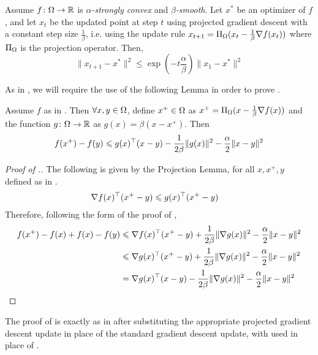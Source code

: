 \begin{theorem} 
Assume $f\colon\Omega\to\mathbb{R}$ is \emph{$\alpha$-strongly convex} and
\emph{$\beta$-smooth}. Let $x^{*}$ be an optimizer of $f$, and let $x_{t}$ be
the updated point at step $t$ using projected gradient descent with a constant
step size $\frac{1}{\beta}$, i.e. using the update rule $x_{t+1} =
\Pi_{\Omega}(x_{t} - \frac{1}{\beta}\nabla f(x_{t}))$ where $\Pi_{\Omega}$ is
the projection operator. Then, 
\[
\|x_{t+1} - x^*\|^2 \leq \exp{(-t \frac{\alpha}{\beta})}\|x_1 - x^*\|^2
\]
\end{theorem}
As in , we will require the
use of the following Lemma in order to prove
. 

\begin{lemma}
    Assume $f$ as in . Then $\forall x,y \in \Omega$, define $x^+\in\Omega$ as $x^+ = \Pi_{\Omega}(x - \frac{1}{\beta}\nabla f(x))$ and the function $g\colon\Omega\to\mathbb{R}$ as $g(x) = \beta(x-x^+)$. Then
    \[
        f(x^+) - f(y) \leqslant g(x)^\top (x-y) - \frac{1}{2\beta}\|g(x)\|^2 - \frac{\alpha}{2}\|x-y\|^2
    \]
\end{lemma}

\begin{proof}[Proof of .]
    The following is given by the Projection Lemma, for all $x,x^+,y$ defined as in .
    \begin{align*}
        \nabla f(x)^\top (x^+ - y) &\leqslant g(x)^\top(x^+ - y)
    \end{align*}
    Therefore, following the form of the proof of ,
    \begin{align*}
        f(x^+) - f(x) + f(x) - f(y) &\leqslant \nabla f(x)^\top(x^+-y) + \frac{1}{2\beta}\|\nabla g(x)\|^2 - \frac{\alpha}{2}\|x-y\|^2\\
        &\leqslant \nabla g(x)^\top(x^+-y) + \frac{1}{2\beta}\|\nabla g(x)\|^2 - \frac{\alpha}{2}\|x-y\|^2\\
        &= \nabla g(x)^\top(x-y) - \frac{1}{2\beta}\|\nabla g(x)\|^2 -
\frac{\alpha}{2}\|x-y\|^2\qedhere
    \end{align*}
\end{proof}

The proof of  is
exactly as in  after
substituting the appropriate projected gradient descent update in place of the
standard gradient descent update, with
 used in place of
. 
